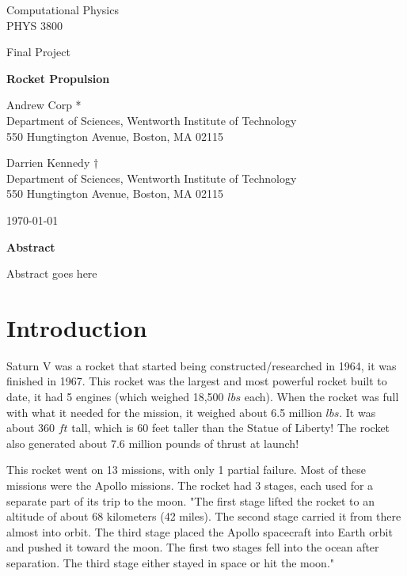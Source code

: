 \documentclass[11pt]{article}
\begin{document}
\begin{titlepage}

	\centering
	{\Large Computational Physics \\ PHYS 3800 \par}
	\vspace{0.25cm}
	{\Large Final Project\par}
	\vspace{2cm}
	
	{\huge \textbf{ Rocket Propulsion} \par}
	\vspace{1cm}
	
	{\large Andrew Corp * \\ Department of Sciences, Wentworth Institute of Technology \\ 550 Hungtington Avenue, Boston, MA 02115}
	
		{\large Darrien Kennedy $\dagger$ \\ Department of Sciences, Wentworth Institute of Technology \\ 550 Hungtington Avenue, Boston, MA 02115}

	{\large \today \par}
\end{titlepage}
\newpage

{\centering \textbf{Abstract} \par}

Abstract goes here

\section{Introduction}
\par Saturn V was a rocket that started being constructed/researched in 1964, it was finished in 1967. This rocket was the largest and most powerful rocket built to date, it had 5 engines (which weighed 18,500 $lbs$ each). When the rocket was full with what it needed for the mission, it weighed about 6.5 million $lbs$. It was about 360 $ft$ tall, which is 60 feet taller than the Statue of Liberty! The rocket also generated about 7.6 million pounds of thrust at launch! 

\vspace{.25cm}
This rocket went on 13 missions, with only 1 partial failure. Most of these missions were the Apollo missions. The rocket had 3 stages, each used for a separate part of its trip to the moon. "The first stage lifted the rocket to an altitude of about 68 kilometers (42 miles). The second stage carried it from there almost into orbit. The third stage placed the Apollo spacecraft into Earth orbit and pushed it toward the moon. The first two stages fell into the ocean after separation. The third stage either stayed in space or hit the moon." \cite{saturnv}
\end{document}
